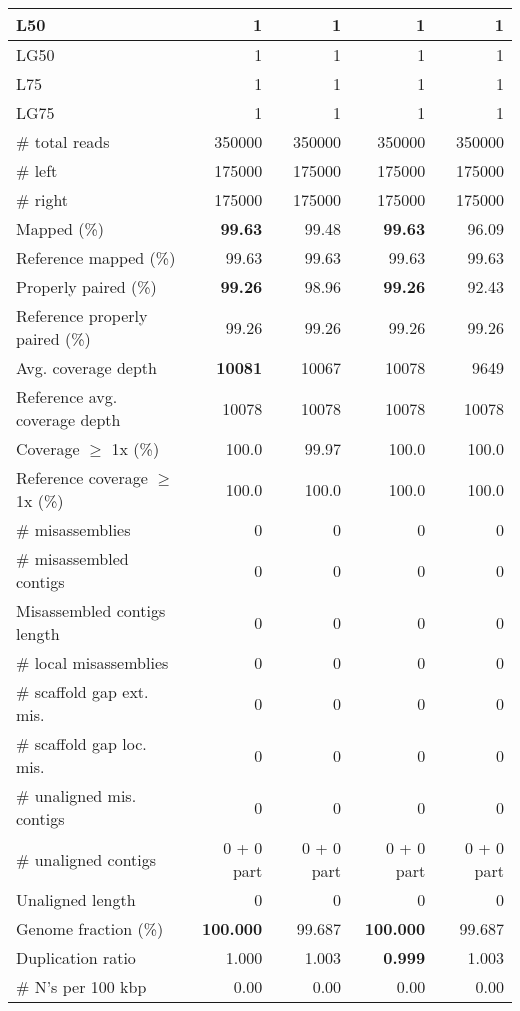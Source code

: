 \documentclass[12pt,a4paper]{article}
\begin{document}
\begin{table}[ht]
\begin{center}
\begin{tabular}{|l*{4}{|r}|}
L50 & 1 & 1 & 1 & 1 \\ \hline
LG50 & 1 & 1 & 1 & 1 \\ \hline
L75 & 1 & 1 & 1 & 1 \\ \hline
LG75 & 1 & 1 & 1 & 1 \\ \hline
\# total reads & 350000 & 350000 & 350000 & 350000 \\ \hline
\# left & 175000 & 175000 & 175000 & 175000 \\ \hline
\# right & 175000 & 175000 & 175000 & 175000 \\ \hline
Mapped (\%) & {\bf 99.63} & 99.48 & {\bf 99.63} & 96.09 \\ \hline
Reference mapped (\%) & 99.63 & 99.63 & 99.63 & 99.63 \\ \hline
Properly paired (\%) & {\bf 99.26} & 98.96 & {\bf 99.26} & 92.43 \\ \hline
Reference properly paired (\%) & 99.26 & 99.26 & 99.26 & 99.26 \\ \hline
Avg. coverage depth & {\bf 10081} & 10067 & 10078 & 9649 \\ \hline
Reference avg. coverage depth & 10078 & 10078 & 10078 & 10078 \\ \hline
Coverage $\geq$ 1x (\%) & 100.0 & 99.97 & 100.0 & 100.0 \\ \hline
Reference coverage $\geq$ 1x (\%) & 100.0 & 100.0 & 100.0 & 100.0 \\ \hline
\# misassemblies & 0 & 0 & 0 & 0 \\ \hline
\# misassembled contigs & 0 & 0 & 0 & 0 \\ \hline
Misassembled contigs length & 0 & 0 & 0 & 0 \\ \hline
\# local misassemblies & 0 & 0 & 0 & 0 \\ \hline
\# scaffold gap ext. mis. & 0 & 0 & 0 & 0 \\ \hline
\# scaffold gap loc. mis. & 0 & 0 & 0 & 0 \\ \hline
\# unaligned mis. contigs & 0 & 0 & 0 & 0 \\ \hline
\# unaligned contigs & 0 + 0 part & 0 + 0 part & 0 + 0 part & 0 + 0 part \\ \hline
Unaligned length & 0 & 0 & 0 & 0 \\ \hline
Genome fraction (\%) & {\bf 100.000} & 99.687 & {\bf 100.000} & 99.687 \\ \hline
Duplication ratio & 1.000 & 1.003 & {\bf 0.999} & 1.003 \\ \hline
\# N's per 100 kbp & 0.00 & 0.00 & 0.00 & 0.00 \\ \hline

\end{tabular}
\end{center}
\end{table}
\end{document}

